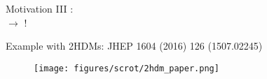 %
\begin{frame}{Motivation III}
	\large
	: \\[1ex]
	 $\longrightarrow$ !
	
	\bigskip
    \bigskip
	Example with 2HDMs: JHEP 1604 (2016) 126 {\footnotesize(1507.02245)}
    \begin{figure}
        \centering
    	\texttt{[image: figures/scrot/2hdm\_paper.png]}
    \end{figure}
    
\end{frame}
%

